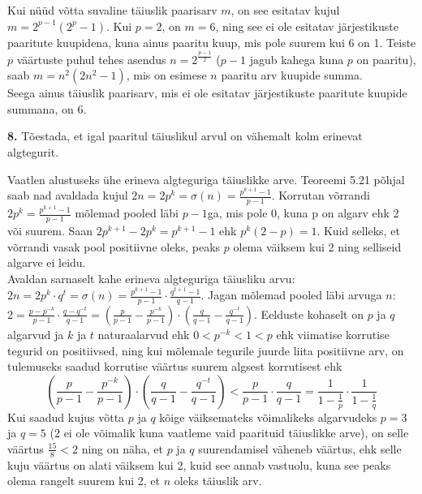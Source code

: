 \documentclass[a4paper, 10pt]{article}
\begin{document}
\indent Kui nüüd võtta suvaline täiuslik paarisarv $m$, on see esitatav kujul $m=2^{p-1}(2^p-1)$. Kui $p=2$, on $m=6$, ning see ei ole esitatav järjestikuste paaritute kuupidena, kuna ainus paaritu kuup, mis pole suurem kui 6 on 1. Teiste $p$ väärtuste puhul tehes asendus $n=2^{\frac{p-1}2}$ ($p-1$ jagub kahega kuna $p$ on paaritu), saab $m=n^2(2n^2-1)$, mis on esimese $n$ paaritu arv kuupide summa.\\
Seega ainus täiuslik paarisarv, mis ei ole esitatav järjestikuste paaritute kuupide summana, on 6.
\bigskip

\pagebreak

\noindent \textbf{8.} Tõestada, et igal paaritul täiuslikul arvul on vähemalt kolm erinevat algtegurit. 

\bigskip
Vaatlen alustuseks ühe erineva algteguriga täiuslikke arve. Teoreemi 5.21 põhjal saab nad avaldada kujul $2n=2p^k=\sigma(n)=\frac{p^{k+1}-1}{p-1}$. Korrutan võrrandi $2p^k=\frac{p^{k+1}-1}{p-1}$ mõlemad pooled läbi $p-1$ga, mis pole 0, kuna p on algarv ehk 2 või suurem. Saan $2p^{k+1}-2p^k=p^{k+1}-1$ ehk $p^k(2-p)=1$. Kuid selleks, et võrrandi vasak pool positiivne oleks, peaks $p$ olema väiksem kui 2 ning selliseid algarve ei leidu.\\
Avaldan sarnaselt kahe erineva algteguriga täiusliku arvu: $2n=2p^k\cdot q^t=\sigma(n)=\frac{p^{k+1}-1}{p-1}\cdot\frac{q^{t+1}-1}{q-1}$. Jagan mõlemad pooled läbi arvuga $n$: $2=\frac{p-p^{-k}}{p-1}\cdot\frac{q-q^{-t}}{q-1}=\left(\frac{p}{p-1}-\frac{p^{-k}}{p-1}\right)\cdot\left(\frac{q}{q-1}-\frac{q^{-t}}{q-1}\right)$. Eelduste kohaselt on $p$ ja $q$ algarvud ja $k$ ja $t$ naturaalarvud ehk $0<p^{-k}<1<p$ ehk viimatise korrutise tegurid on positiivsed, ning kui mõlemale tegurile juurde liita positiivne arv, on tulemuseks saadud korrutise väärtus suurem algsest korrutisest ehk $$\left(\frac{p}{p-1}-\frac{p^{-k}}{p-1}\right)\cdot\left(\frac{q}{q-1}-\frac{q^{-t}}{q-1}\right)<\frac{p}{p-1}\cdot\frac{q}{q-1}=\frac{1}{1-\frac{1}{p}}\cdot\frac{1}{1-\frac 1q}$$ Kui saadud kujus võtta $p$ ja $q$ kõige väiksemateks võimalikeks algarvudeks $p=3$ ja $q=5$ (2 ei ole võimalik kuna vaatleme vaid paarituid täiuslikke arve), on selle väärtus $\frac{15}8<2$ ning on näha, et $p$ ja $q$ suurendamisel väheneb väärtus, ehk selle kuju väärtus on alati väiksem kui 2, kuid see annab vastuolu, kuna see peaks olema rangelt suurem kui 2, et $n$ oleks täiuslik arv.
\end{document}
